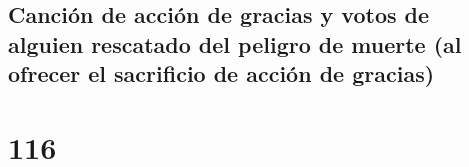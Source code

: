 \hypertarget{canciuxf3n-de-acciuxf3n-de-gracias-y-votos-de-alguien-rescatado-del-peligro-de-muerte-al-ofrecer-el-sacrificio-de-acciuxf3n-de-gracias}{%
\subsection{Canción de acción de gracias y votos de alguien rescatado
del peligro de muerte (al ofrecer el sacrificio de acción de
gracias)}\label{canciuxf3n-de-acciuxf3n-de-gracias-y-votos-de-alguien-rescatado-del-peligro-de-muerte-al-ofrecer-el-sacrificio-de-acciuxf3n-de-gracias}}

\hypertarget{section-115}{%
\section{116}\label{section-115}}

